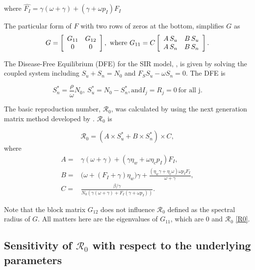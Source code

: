 \documentclass[12pt]{article}
\newcommand{\Rnum}{\mathcal{R}_0}
\theoremstyle{definition} %
\begin{document}
where $\hat{F_I}=\gamma(\omega +\gamma)+(\gamma+\omega p_I)F_I$


The particular form of $F$ with two rows of zeros at the bottom, simplifies $G$ as
\begin{equation}
G = \left[ \begin {array}{cc}
G_{11}&G_{12}\\
0&0
\end {array} \right], \text{ where } \\
G_{11} =C
\left[\begin {array}{cc}
A\,S_u & B\,S_u\\
A\,S_n & B\,S_n
\end {array}\right].
\end{equation}

The Disease-Free Equilibrium (DFE) for the SIR model, , is given by solving the coupled system including $S_u+S_n=N_0$ and $F_S S_u-\omega S_n=0$. The DFE is

\begin{equation}
\label{dfe}
S_n^*= \frac{\rho}{\omega} N_0, \ S_u^*= N_0-S_n^*, \text{and} I_j=R_j=0 \ \text{for all j}.
\end{equation}

The basic reproduction number, $\Rnum$, was calculated by using the next generation matrix method developed by \cite{van2002reproduction}. $\Rnum$ is

\begin{equation}
\label{R0}
\Rnum= (A \times S_u^* + B \times S_n^*) \times C,
\end{equation}
where
\begin{align*}
A=& \gamma(\omega+\gamma) + (\gamma \eta_w + \omega \eta_c p_I) F_I, \\
B=& \big(\omega+(F_I+\gamma)\eta_w\big) \gamma+\frac{(\eta_w \gamma+ \eta_c\omega) \omega p_I F_I }{\omega+\gamma}, \\
C=& \frac{\beta/\gamma}{N_0 (\gamma(\omega+\gamma)+F_I(\gamma+\omega p_I))}.
\end{align*}

Note that the block matrix $G_{12}$ does not influence $\Rnum$ defined as the spectral radius of $G$. All matters here are the eigenvalues of $G_{11}$, which are 0 and $\Rnum$ \eqref{R0}.
% 
\subsection{Sensitivity of $\Rnum$ with respect to the underlying parameters}
\end{document}
